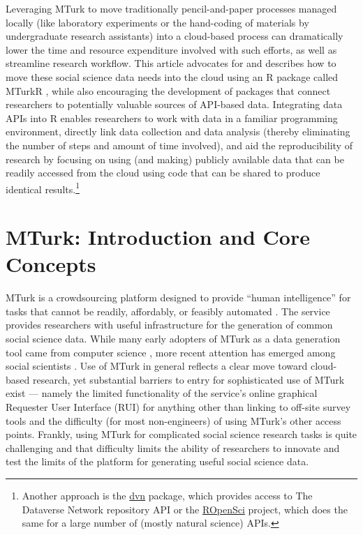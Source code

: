 \documentclass[11pt]{article}
\begin{document}
Leveraging MTurk to move traditionally pencil-and-paper processes managed locally (like laboratory experiments or the hand-coding of materials by undergraduate research assistants) into a cloud-based process can dramatically lower the time and resource expenditure involved with such efforts, as well as streamline research workflow. This article advocates for and describes how to move these social science data needs into the cloud using an R package called MTurkR \citep{Leeper2012c}, while also encouraging the development of packages that connect researchers to potentially valuable sources of API-based data. Integrating data APIs into R enables researchers to work with data in a familiar programming environment, directly link data collection and data analysis (thereby eliminating the number of steps and amount of time involved), and aid the reproducibility of research by focusing on using (and making) publicly available data that can be readily accessed from the cloud using code that can be shared to produce identical results.\footnote{Another approach is the \href{http://cran.r-project.org/web/packages/dvn/index.html}{dvn} package, which provides access to The Dataverse Network repository API \citep{Leeper2013} or the \href{http://ropensci.org/}{ROpenSci} project, which does the same for a large number of (mostly natural science) APIs.}

\section{MTurk: Introduction and Core Concepts}
MTurk is a crowdsourcing platform designed to provide ``human intelligence'' for tasks that cannot be readily, affordably, or feasibly automated \citep{Amazon2012}. The service provides researchers with useful infrastructure for the generation of common social science data. While many early adopters of MTurk as a data generation tool came from computer science \citep{MasonSuri2011, KitturChiSuh2008}, more recent attention has emerged among social scientists \citep{BuhrmesterKwangGosling2011, BerinskyHuberLenz2010, PaolacciChandlerStern2010}. Use of MTurk in general reflects a clear move toward cloud-based research, yet substantial barriers to entry for sophisticated use of MTurk exist --- namely the limited functionality of the service's online graphical Requester User Interface (RUI) for anything other than linking to off-site survey tools and the difficulty (for most non-engineers) of using MTurk's other access points. Frankly, using MTurk for complicated social science research tasks is quite challenging and that difficulty limits the ability of researchers to innovate and test the limits of the platform for generating useful social science data.
\end{document}
